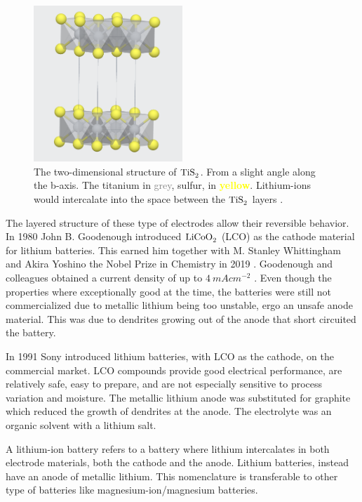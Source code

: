 \begin{figure}[H]
    \centering
    \includegraphics[width=0.5\textwidth]{TiS2.png}
    \caption{The two-dimensional structure of $\ce{TiS_2}$. From a slight angle along the b-axis. The titanium in \textcolor{gray}{grey}, sulfur, in \textcolor{yellow}{\textbf{yellow}}. Lithium-ions would intercalate into the space between the $\ce{TiS_2}$ layers \cite{materialsproject:TiS2}.}
    \label{fig:MPTiS2}
\end{figure}

The layered structure of these type of electrodes allow their reversible behavior. In 1980 John B. Goodenough introduced $\ce{LiCoO_2}$ (\ac{LCO}) as the cathode material for lithium batteries. This earned him together with M. Stanley Whittingham and Akira Yoshino the Nobel Prize in Chemistry in 2019 \cite{nobprize}. Goodenough and colleagues obtained a current density of up to $\SI{4}{mAcm^{-2}}$ \cite{mizushima1980lixcoo2} \cite{goodenough1980solid}. Even though the properties where exceptionally good at the time, the batteries were still not commercialized due to metallic lithium being too unstable, ergo an unsafe anode material. This was due to dendrites growing out of the anode that short circuited the battery. 

In 1991 Sony introduced lithium batteries, with LCO as the cathode, on the commercial market. LCO compounds provide good electrical performance, are relatively safe, easy to prepare, and are not especially sensitive to process variation and moisture. The metallic lithium anode was substituted for graphite which reduced the growth of dendrites at the anode. The electrolyte was an organic solvent with a lithium salt. 

A lithium-ion battery refers to a battery where lithium intercalates in both electrode materials, both the cathode and the anode. Lithium batteries, instead have an anode of metallic lithium. This nomenclature is transferable to other type of batteries like magnesium-ion/magnesium batteries. 

